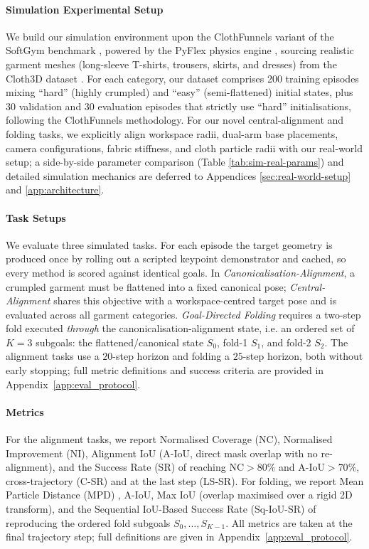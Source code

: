 \documentclass[journal]{IEEEtran}
\begin{document}
\paragraph{Simulation Experimental Setup}
We build our simulation environment upon the ClothFunnels variant of the SoftGym benchmark \cite{lin2020softgym}, powered by the PyFlex physics engine \cite{li2018learning}, sourcing realistic garment meshes (long-sleeve T-shirts, trousers, skirts, and dresses) from the Cloth3D dataset \cite{bertiche2020cloth3d}. For each category, our dataset comprises 200 training episodes mixing ``hard'' (highly crumpled) and ``easy'' (semi-flattened) initial states, plus 30 validation and 30 evaluation episodes that strictly use ``hard'' initialisations, following the ClothFunnels methodology. For our novel central-alignment and folding tasks, we explicitly align workspace radii, dual-arm base placements, camera configurations, fabric stiffness, and cloth particle radii with our real-world setup; a side-by-side parameter comparison (Table \ref{tab:sim-real-params}) and detailed simulation mechanics are deferred to Appendices \ref{sec:real-world-setup} and \ref{app:architecture}.

\paragraph{Task Setups} We evaluate three simulated tasks. For each episode the target geometry is produced once by rolling out a scripted keypoint demonstrator and cached, so every method is scored against identical goals. In \emph{Canonicalisation-Alignment}, a crumpled garment must be flattened into a fixed canonical pose; \emph{Central-Alignment} shares this objective with a workspace-centred target pose and is evaluated across all garment categories. \emph{Goal-Directed Folding} requires a two-step fold executed \emph{through} the canonicalisation-alignment state, i.e. an ordered set of $K=3$ subgoals: the flattened/canonical state $S_0$, fold-1 $S_1$, and fold-2 $S_2$. The alignment tasks use a $20$-step horizon and folding a $25$-step horizon, both without early stopping; full metric definitions and success criteria are provided in Appendix~\ref{app:eval_protocol}.



\paragraph{Metrics} For the alignment tasks, we report Normalised Coverage (NC), Normalised Improvement (NI), Alignment IoU (A-IoU, direct mask overlap with no re-alignment), and the Success Rate (SR) of reaching $\text{NC}>80\%$ and $\text{A-IoU}>70\%$, cross-trajectory (C-SR) and at the last step (LS-SR). For folding, we report Mean Particle Distance (MPD) \cite{canberk2022cloth}, A-IoU, Max IoU (overlap maximised over a rigid 2D transform), and the Sequential IoU-Based Success Rate (Sq-IoU-SR) of reproducing the ordered fold subgoals $S_0,\dots,S_{K-1}$. All metrics are taken at the final trajectory step; full definitions are given in Appendix~\ref{app:eval_protocol}.
\end{document}
